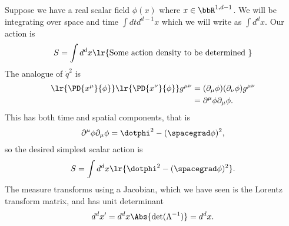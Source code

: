 Suppose we have a real scalar field \( \phi(x) \) where \( x \in \bbR^{1,d-1} \).  We will be integrating over space and time \( \int dt d^{d-1} x \) which we will write as \( \int d^d x \).  Our action is
\begin{equation}\label{eqn:qftLecture3:400}
S = \int d^d x \lr{ \text{Some action density to be determined } }
\end{equation}
The analogue of \( \dot{q}^2 \) is
\begin{equation}\label{eqn:qftLecture3:420}
\begin{aligned}
\lr{ \PD{x^\mu}{\phi} }
\lr{ \PD{x^\nu}{\phi} }
g^{\mu\nu}
&=
(\partial_\mu \phi) (\partial_\nu \phi) g^{\mu\nu} \\
&= \partial^\mu \phi \partial_\mu \phi.
\end{aligned}
\end{equation}
This has both time and spatial components, that is
\begin{equation}\label{eqn:qftLecture3:440}
\partial^\mu \phi \partial_\mu \phi =
\dotphi^2 - (\spacegrad \phi)^2,
\end{equation}
so the desired simplest scalar action is
\begin{equation}\label{eqn:qftLecture3:460}
S = \int d^d x \lr{ \dotphi^2 - (\spacegrad \phi)^2 }.
\end{equation}
The measure transforms using a Jacobian, which we have seen is the Lorentz transform matrix, and has unit determinant
\begin{equation}\label{eqn:qftLecture3:480}
d^d x' = d^d x \Abs{ \det( \Lambda^{-1} ) } = d^d x.
\end{equation}

